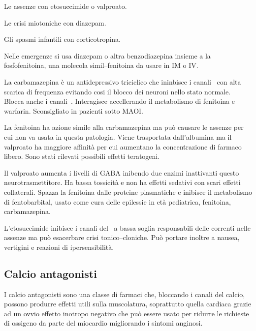 Le assenze con etosuccimide o valproato.

Le crisi miotoniche con diazepam.

Gli spasmi infantili con corticotropina.

Nelle emergenze si usa diazepam o altra benzodiazepina insieme a la fosfofenitoina, una molecola simil--fenitoina da usare in IM o IV.

La carbamazepina è un antidepressivo triciclico che ininbisce i canali~ con alta scarica di frequenza evitando cosi il blocco dei neuroni nello stato normale. Blocca anche i canali~. Interagisce accellerando il metabolismo di fenitoina e warfarin. Sconsigliato in pazienti sotto MAOI. 

La fenitoina ha azione simile alla carbamazepina ma può causare le assenze per cui non va usata in questa patologia. Viene trasportata dall'albumina ma il valproato ha maggiore affinità per cui aumentano la concentrazione di farmaco libero. Sono stati rilevati possibili effetti teratogeni.

Il valproato aumenta i livelli di GABA inibendo due enzimi inattivanti questo neurotrasmettitore. Ha bassa tossicità e non ha effetti sedativi con scari effetti collaterali. Spazza la fenitoina dalle proteine plasmatiche e inibisce il metabolismo di fentobarbital, usato come cura delle epilessie in età pediatrica, fenitoina, carbamazepina.

L'etosuccimide inibisce i canali del~ a bassa soglia responsabili delle correnti nelle assenze ma può esacerbare crisi tonico--cloniche. Può portare inoltre a nausea, vertigini e reazioni di ipersensibilità.

\subsection{Calcio antagonisti}

I calcio antagonisti sono una classe di farmaci che, bloccando i canali del calcio, possono produrre effetti utili sulla muscolatura, soprattutto quella cardiaca grazie ad un ovvio effetto inotropo negativo che può essere usato per ridurre le richieste di ossigeno da parte del miocardio migliorando i sintomi anginosi.


